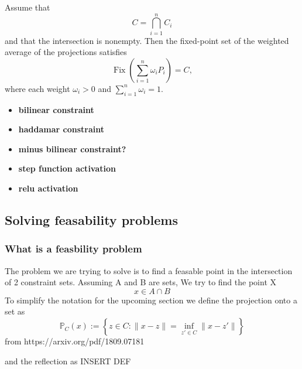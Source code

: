 Assume that
\[
    C = \bigcap_{i=1}^n C_i
\]
and that the intersection is nonempty. Then the fixed-point set of the 
weighted average of the projections satisfies
\[
    \operatorname{Fix}\!\left(\sum_{i=1}^n \omega_i P_i\right) = C,
\]
where each weight \(\omega_i > 0\) and 
\(\sum_{i=1}^n \omega_i = 1\).


\begin{itemize} 
    \item \textbf{bilinear constraint}
    
    \item \textbf{haddamar constraint}
    

    \item \textbf{minus bilinear constraint?}\\
    
    \item \textbf{step function activation}\\
    
    \item \textbf{relu activation}\\
    

\end{itemize}

\subsection{Solving feasability problems}
\subsubsection{What is a feasbility problem}
The problem we are trying to solve is to find a feasable point in the intersection of 2 constraint sets. Assuming A and B are sets, We try to find the point X
\begin{equation}
    x \in A \cap B
\end{equation}
To simplify the notation for the upcoming section we define the projection onto a set as 
\begin{equation}
\mathbb{P}_C(x) := \left\{ z \in C : \|x - z\| = \inf_{z' \in C} \|x - z'\| \right\}
\end{equation}
from {https://arxiv.org/pdf/1809.07181}

and the reflection as INSERT DEF\\
